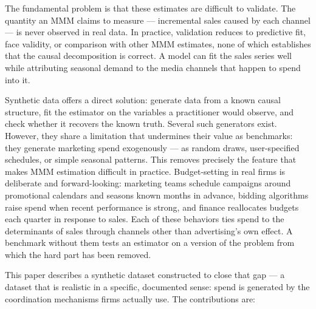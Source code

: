 \documentclass[
  conference]{IEEEtran}
\begin{document}
The fundamental problem is that these estimates are difficult to
validate. The quantity an MMM claims to measure --- incremental sales
caused by each channel --- is never observed in real data. In practice,
validation reduces to predictive fit, face validity, or comparison with
other MMM estimates, none of which establishes that the causal
decomposition is correct. A model can fit the sales series well while
attributing seasonal demand to the media channels that happen to spend
into it.

Synthetic data offers a direct solution: generate data from a known
causal structure, fit the estimator on the variables a practitioner
would observe, and check whether it recovers the known truth. Several
such generators exist. However, they share a limitation that undermines
their value as benchmarks: they generate marketing spend exogenously ---
as random draws, user-specified schedules, or simple seasonal patterns.
This removes precisely the feature that makes MMM estimation difficult
in practice. Budget-setting in real firms is deliberate and
forward-looking: marketing teams schedule campaigns around promotional
calendars and seasons known months in advance, bidding algorithms raise
spend when recent performance is strong, and finance reallocates budgets
each quarter in response to sales. Each of these behaviors ties spend to
the determinants of sales through channels other than advertising's own
effect. A benchmark without them tests an estimator on a version of the
problem from which the hard part has been removed.

This paper describes a synthetic dataset constructed to close that gap
--- a dataset that is realistic in a specific, documented sense: spend
is generated by the coordination mechanisms firms actually use. The
contributions are:
\end{document}
